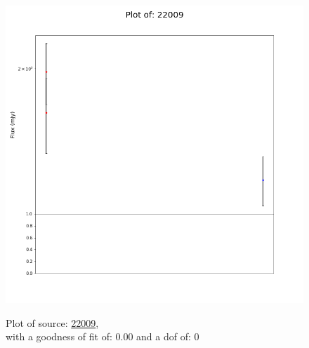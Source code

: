\documentclass{article}
\begin{document}
\begin{figure}[H]
    \centering
    \begin{minipage}{.5\textwidth}
        \centering
        \includegraphics[scale = 0.35]{KmeulenTrap4P23_1min/1min22009.png}
        \captionsetup{labelformat=empty}
        \caption{Plot of source: \href{http://banana.transientskp.org/r4/vlo_KmeulenTrap4P23/runningcatalog/22009}{22009},\\with a goodness of fit of: 0.00 and a dof of: 0}
        \addtocounter{figure}{-1}
        \label{KmeulenTrap4P23:1min:22009:plot}
    \end{minipage}%
    \begin{minipage}{0.5\textwidth}
        \centering


\end{minipage}
\end{figure}
\end{document}
